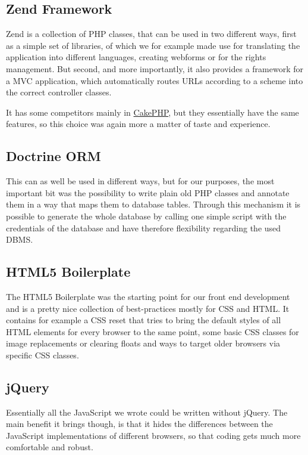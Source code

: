 \subsection{Zend Framework}

Zend is a collection of PHP classes, that can be used in two different ways, first as a simple set of libraries, of which we for example made use for translating the application into different languages, creating webforms or for the rights management. But second, and more importantly, it also provides a framework for a MVC application, which automatically routes URLs according to a scheme into the correct controller classes.

It has some competitors mainly in \href{http://cakephp.de/}{CakePHP}, but they essentially have the same features, so this choice was again more a matter of taste and experience.

\subsection{Doctrine ORM}

This can as well be used in different ways, but for our purposes, the most important bit was the possibility to write plain old PHP classes and annotate them in a way that maps them to database tables. Through this mechanism it is possible to generate the whole database by calling one simple script with the credentials of the database and have therefore flexibility regarding the used DBMS.

\subsection{HTML5 Boilerplate}

The HTML5 Boilerplate was the starting point for our front end development and is a pretty nice collection of best-practices mostly for CSS and HTML. It contains for example a CSS reset that tries to bring the default styles of all HTML elements for every browser to the same point, some basic CSS classes for image replacements or clearing floats and ways to target older browsers via specific CSS classes.

\subsection{jQuery}

Essentially all the JavaScript we wrote could be written without jQuery. The main benefit it brings though, is that it hides the differences between the JavaScript implementations of different browsers, so that coding gets much more comfortable and robust.

